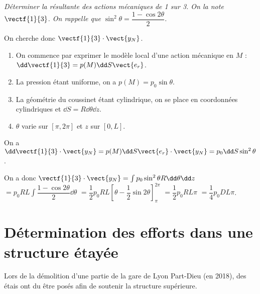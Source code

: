 \begin{multicols}{2}
\begin{multicols}{2}
\subparagraph{}\textit{Déterminer la résultante des actions mécaniques de 1 sur 3. On la note $\vectf{1}{3}$. On rappelle que $\sin^2\theta =\dfrac{1-\cos 2\theta }{2}$. }
\ifprof
\begin{corrige}
On cherche donc $\vectf{1}{3} \cdot \vect{y_N}$.
\begin{enumerate}
\item On commence par exprimer le modèle local d'une action mécanique en $M$ : $\dd \vectf{1}{3} = p(M) \dd S \vect{e_r}$.
\item La pression étant uniforme, on a $p(M)=p_0 \sin\theta$.
\item La géométrie du coussinet étant cylindrique, on se place en coordonnées cylindriques et $\dd S = R\dd \theta \dd z$.  
\item $\theta$ varie sur $[\pi, 2\pi]$ et $z$ sur $[0,L]$. 
\end{enumerate}

On a  $\dd \vectf{1}{3} \cdot \vect{y_N} = p(M) \dd S \vect{e_r} \cdot \vect{y_N} =p_0 \dd S  \sin^2 \theta $. 

On a donc $\vectf{1}{3} \cdot \vect{y_N} = \int  p_0  \sin^2 \theta  R\dd \theta \dd z $
$ =   p_0 R L \int \dfrac{1-\cos 2\theta }{2}   \dd \theta$
$ =   \dfrac{1}{2}p_0 R L \left[\theta-\dfrac{1}{2}\sin 2\theta \right]^{2\pi}_{\pi} $
$ =   \dfrac{1}{2}p_0 R L {\pi} $
$ =   \dfrac{1}{4}p_0 D L {\pi} $.
\end{corrige}
\else
\fi

\noindent\footnotesize
{}
\normalsize

\ifprof
\newpage
\else
\fi

\section*{Détermination des efforts dans une structure étayée}
\setcounter{exo}{0}
\ifprof
\else
Lors de la démolition d'une partie de la gare de Lyon Part-Dieu (en 2018), des étais ont du être posés afin de soutenir la structure supérieure. 


\end{multicols}
\end{multicols}
